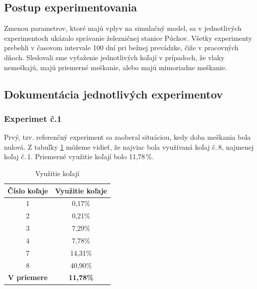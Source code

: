 \documentclass[12pt,a4paper,titlepage,final]{article}
\begin{document}
\subsection{Postup experimentovania}

Zmenou parametrov, ktoré majú vplyv na simulačný model, sa v jednotlivých experimentoch ukázalo správanie železničnej stanice Púchov. Všetky experimenty prebehli v časovom intervale 100 dní pri bežnej prevádzke, čiže v pracovných dňoch. Sledovali sme vyťaženie jednotlivých koľají v prípadoch, že vlaky nemeškajú, majú priemerné meškanie, alebo majú mimoriadne meškanie.

\subsection{Dokumentácia jednotlivých experimentov}

\subsubsection{Experimet č.1}

Prvý, tzv. referenčný experiment sa zaoberal situáciou, kedy doba meškania bola nulová. Z tabuľky \ref{tab1} môžeme vidieť, že najviac bola využívaná koľaj č.\,8, najmenej koľaj č.\,1. Priemerné využitie koľají bolo 11,78\,\%.

\begin{table}[h]
\centering
\begin{center}
\begin{tabular}{| c | c |}
\hline
{\textbf{Číslo koľaje}} & {\textbf{Využitie koľaje}} \\
\hline
1 & 0,17\% \\
2 & 0,21\% \\
3 & 7,29\% \\
4 & 7,78\% \\
7 & 14,31\% \\
8 & 40,90\% \\
\hline
{\textbf{V priemere}} & {\textbf{11,78\%}} \\
\hline
\end{tabular}
\caption{Využitie koľají}
\label{tab1}
\end{center}
\end{table}
\end{document}

